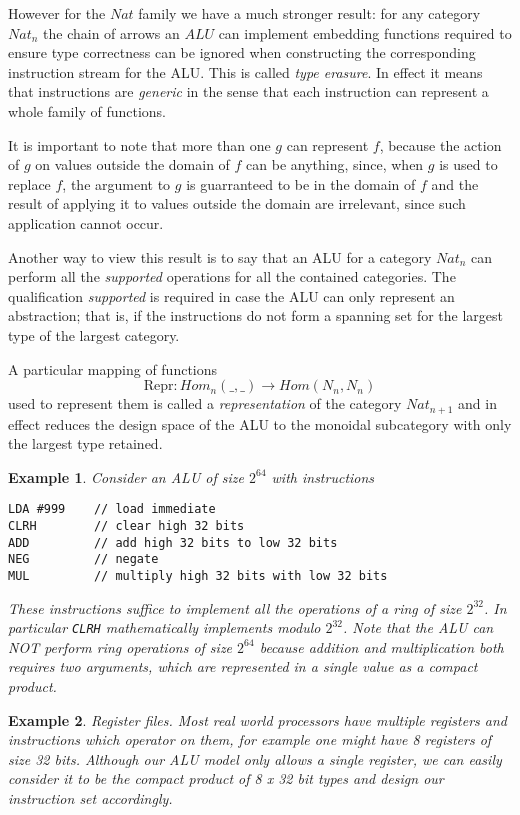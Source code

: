 \documentclass[oneside]{book}
\theoremstyle{plain}
\newtheorem{example}{Example}
\theoremstyle{definition}
\theoremstyle{plain}
\def\Nat{\mathit{Nat}}
\def\Hom{\mathit{Hom}}
\def\ALU{\mathit{ALU}}
\begin{document}
However for the $\Nat$ family we have a much stronger result: for any
category $\Nat_n$ the chain of arrows an $\ALU$ can implement embedding
functions required to ensure type correctness can be ignored when constructing
the corresponding instruction stream for the ALU.
This is called {\em type erasure}. In effect it means that instructions
are {\em generic} in the sense that each instruction can represent a whole
family of functions.

It is important to note that more than one $g$ can represent $f$, because
the action of $g$ on values outside the domain of $f$ can be anything,
since, when $g$ is used to replace $f$, the argument to $g$ is guarranteed
to be in the domain of $f$ and the result of applying it to values
outside the domain are irrelevant, since such application cannot occur.

Another way to view this result is to say that an ALU for a category
$Nat_n$ can perform all the {\em supported} operations for all the contained
categories. The qualification {\em supported} is required in case
the ALU can only represent an abstraction; that is, if the instructions
do not form a spanning set for the largest type of the largest category.

A particular mapping of functions 
$$\mathrm{Repr}: \Hom_n(\_,\_) \rightarrow \Hom(N_n, N_n)$$
used to represent them is called a {\em representation} of 
the category $\Nat_{n+1}$ and in effect reduces the design
space of the ALU to the monoidal subcategory with only
the largest type retained.

\begin{example}
Consider an ALU of size $2^{64}$ with instructions
\begin{verbatim}
LDA #999    // load immediate
CLRH        // clear high 32 bits
ADD         // add high 32 bits to low 32 bits
NEG         // negate
MUL         // multiply high 32 bits with low 32 bits
\end{verbatim}
These instructions suffice to implement all the operations
of a ring of size $2^{32}$. In particular \verb$CLRH$ mathematically
implements modulo $2^{32}$. Note that the ALU can {\em NOT} perform
ring operations of size $2^{64}$ because addition and multiplication
both requires two arguments, which are represented in a single value
as a compact product.
\end{example}

\begin{example}
{\em Register files.} Most real world processors have multiple registers and
instructions which operator on them, for example one might have 8 registers
of size 32 bits. Although our ALU model only allows a single register,
we can easily consider it to be the compact product of 8 x 32 bit types
and design our instruction set accordingly.
\end{example}
\end{document}
